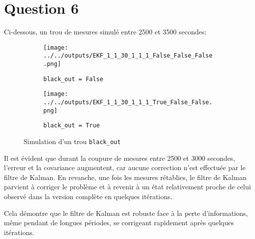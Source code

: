 \documentclass[../CSC_5RO12_TA_TP2.tex]{subfiles}
\begin{document}
\section{Question 6}
\noindent Ci-dessous, un trou de mesures simulé entre 2500 et 3500 secondes:
\begin{figure}[H]
    \centering
    \begin{subfigure}[b]{0.475\textwidth}
        \centering
        \texttt{[image: ../../outputs/EKF\_1\_1\_30\_1\_1\_1\_False\_False\_False.png]}
        \caption{\texttt{black\_out = False}}
        \label{}
    \end{subfigure}\hfill
    \begin{subfigure}[b]{0.475\textwidth}
        \centering
        \texttt{[image: ../../outputs/EKF\_1\_1\_30\_1\_1\_1\_True\_False\_False.png]}
        \caption{\texttt{black\_out = True}}
        \label{}
    \end{subfigure}
    \caption{Simulation d'un trou \texttt{black\_out}}
    \label{}
\end{figure}
\noindent Il est évident que durant la coupure de mesures entre 2500 et 3000 secondes, l'erreur et la covariance augmentent, car aucune correction n'est effectuée par le filtre de Kalman. En revanche, une fois les mesures rétablies, le filtre de Kalman parvient à corriger le problème et à revenir à un état relativement proche de celui observé dans la version complète en quelques itérations.
\begin{remark}
    Cela démontre que le filtre de Kalman est robuste face à la perte d'informations, même pendant de longues périodes, se corrigeant rapidement après quelques itérations.
\end{remark}
\end{document}
